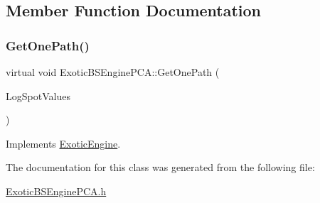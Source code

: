 \subsection{Member Function Documentation}
\hypertarget{classExoticBSEnginePCA_ad34270f94895d699ff3d3a0ebc020e9f}{}\label{classExoticBSEnginePCA_ad34270f94895d699ff3d3a0ebc020e9f} 
\subsubsection{\texorpdfstring{Get\+One\+Path()}{GetOnePath()}}
{\footnotesize\ttfamily virtual void Exotic\+B\+S\+Engine\+P\+C\+A\+::\+Get\+One\+Path (\begin{DoxyParamCaption}\item[{\hyperlink{classMJArray}{M\+J\+Array} \&}]{Log\+Spot\+Values }\end{DoxyParamCaption})\hspace{0.3cm}{\ttfamily [virtual]}}



Implements \hyperlink{classExoticEngine_a1be567d24e89abadb95bb2af7224b54e}{Exotic\+Engine}.



The documentation for this class was generated from the following file\+:\begin{DoxyCompactItemize}
\item 
\hyperlink{ExoticBSEnginePCA_8h}{Exotic\+B\+S\+Engine\+P\+C\+A.\+h}\end{DoxyCompactItemize}
